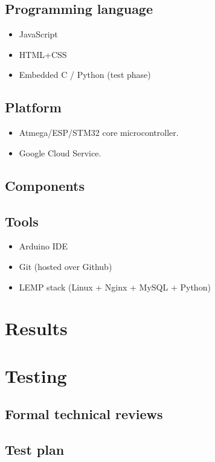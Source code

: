 \documentclass[twoside,a4paper,12pt]{book}
\begin{document}
\section{Programming language}
\begin{itemize}
    \item JavaScript
    \item HTML+CSS
    \item Embedded C / Python (test phase)
\end{itemize}

\section{Platform}
\begin{itemize}
    \item Atmega/ESP/STM32 core microcontroller.
    \item Google Cloud Service.
\end{itemize}

\newpage 


\section{Components}

\section{Tools}
\begin{itemize}
    \item Arduino IDE
    \item Git (hosted over Github)
    \item LEMP stack (Linux + Nginx + MySQL + Python)
\end{itemize}


\chapter{Results}


\chapter{Testing}
\section{Formal technical reviews} %
\section{Test plan}
\end{document}
